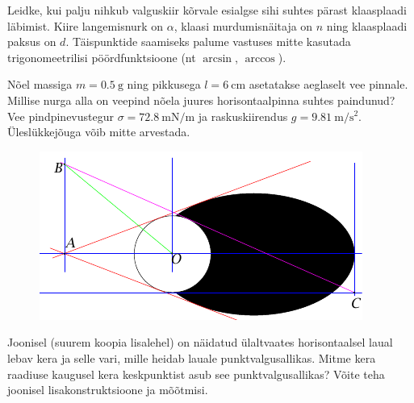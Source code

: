 \documentclass[10pt]{article}
\begin{document}
Leidke, kui palju nihkub valguskiir kõrvale esialgse sihi suhtes pärast klaasplaadi läbimist. Kiire langemisnurk on $\alpha$, klaasi murdumisnäitaja on $n$ ning klaasplaadi paksus on $d$. Täispunktide saamiseks palume vastuses mitte kasutada trigonomeetrilisi pöördfunktsioone (nt $\arcsin$, $\arccos$).
\probend
\bigskip


Nõel massiga $m=\SI{0.5}{\g}$ ning pikkusega $l=\SI{6}{\cm}$ asetatakse aeglaselt vee pinnale. Millise nurga alla on veepind nõela juures horisontaalpinna suhtes paindunud? Vee pindpinevustegur $\sigma=\SI{72.8}{\mN\per\m}$ ja raskuskiirendus $g=\SI{9.81}{\m\per\s\squared}$. Üleslükkejõuga võib mitte arvestada.
\probend
\bigskip


\begin{figure}
\vspace{-0.8cm}
  \begin{center}
    \includegraphics[width=1\linewidth]{2024-lahg-06-yl.pdf}
  \end{center}
  \vspace{-0.9cm}
\end{figure}

Joonisel (suurem koopia lisalehel) on näidatud ülaltvaates horisontaalsel laual lebav kera ja selle vari, mille heidab lauale punktvalgusallikas. Mitme kera raadiuse kaugusel kera keskpunktist asub see punktvalgusallikas? Võite teha joonisel lisakonstruktsioone ja mõõtmisi.
\probend
\bigskip

\end{document}
